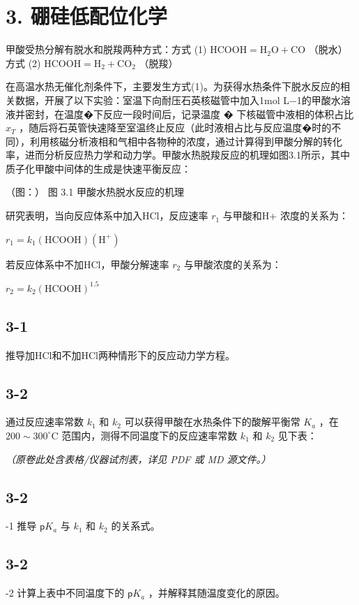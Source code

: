\section*{3. 硼硅低配位化学}
甲酸受热分解有脱⽔和脱羧两种⽅式：⽅式 (1) $\mathrm { H C O O H } = \mathrm { H _ { 2 } O } + \mathrm { C O }$ （脱⽔）⽅式 (2) $\mathrm { H C O O H } = \mathrm { H } _ { 2 } + \mathrm { C O } _ { 2 }$ （脱羧）

在⾼温⽔热⽆催化剂条件下，主要发⽣⽅式(1)。为获得⽔热条件下脱⽔反应的相关数据，开展了以下实验：室温下向耐压⽯英核磁管中加⼊1mol L−1的甲酸⽔溶液并密封，在温度�下反应⼀段时间后，记录温度 � 下核磁管中液相的体积占⽐ $x _ { T }$ ，随后将⽯英管快速降⾄室温终⽌反应（此时液相占⽐与反应温度�时的不同），利⽤核磁分析液相和⽓相中各物种的浓度，通过计算得到甲酸分解的转化率，进⽽分析反应热⼒学和动⼒学。甲酸⽔热脱羧反应的机理如图3.1所⽰，其中质⼦化甲酸中间体的⽣成是快速平衡反应：

（图：）
图 3.1 甲酸⽔热脱⽔反应的机理

研究表明，当向反应体系中加⼊HCl，反应速率 $r _ { 1 }$ 与甲酸和H+ 浓度的关系为：

$
r _ {1} = k _ {1} (\mathrm{HCOOH}) \left(\mathrm{H} ^ {+}\right)
$

若反应体系中不加HCl，甲酸分解速率 $r _ { 2 }$ 与甲酸浓度的关系为：

$
r _ {2} = k _ {2} (\mathrm{HCOOH}) ^ {1. 5}
$

\subsection*{3-1}
推导加HCl和不加HCl两种情形下的反应动⼒学⽅程。

\subsection*{3-2}
通过反应速率常数 $k _ { 1 }$ 和 $k _ { 2 }$ 可以获得甲酸在⽔热条件下的酸解平衡常 $K _ { a }$ ，在 $2 0 0 { \sim } 3 0 0 ^ { \circ } \mathrm { C }$ 范围内，测得不同温度下的反应速率常数 $k _ { 1 }$ 和 $k _ { 2 }$ ⻅下表：

\textit{（原卷此处含表格/仪器试剂表，详见 PDF 或 MD 源文件。）}

\subsection*{3-2}
-1 推导 $\mathsf { p } K _ { a }$ 与 $k _ { 1 }$ 和 $k _ { 2 }$ 的关系式。

\subsection*{3-2}
-2 计算上表中不同温度下的 $\mathsf { p } K _ { a }$ ，并解释其随温度变化的原因。

